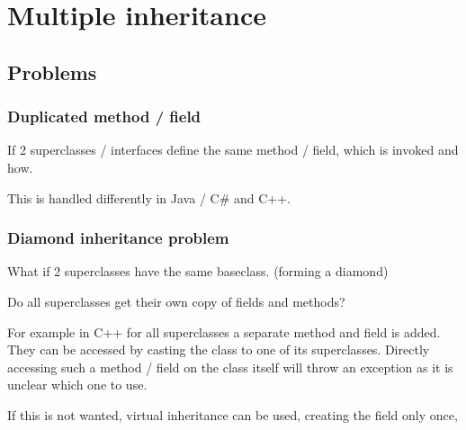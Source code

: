 \documentclass[12pt]{article}
\begin{document}
\section*{Multiple inheritance}
\subsection*{Problems}
\subsubsection*{Duplicated method / field}
If 2 superclasses / interfaces define the same method / field, which is invoked and how.

This is handled differently in Java / C# and C++.
\subsubsection*{Diamond inheritance problem}
What if 2 superclasses have the same baseclass. (forming a diamond)

Do all superclasses get their own copy of fields and methods?

For example in C++ for all superclasses a separate method and field is added. They can be accessed by casting the class to one of its superclasses.
Directly accessing such a method / field on the class itself will throw an exception as it is unclear which one to use.

If this is not wanted, virtual inheritance can be used, creating the field only once,
\end{document}
